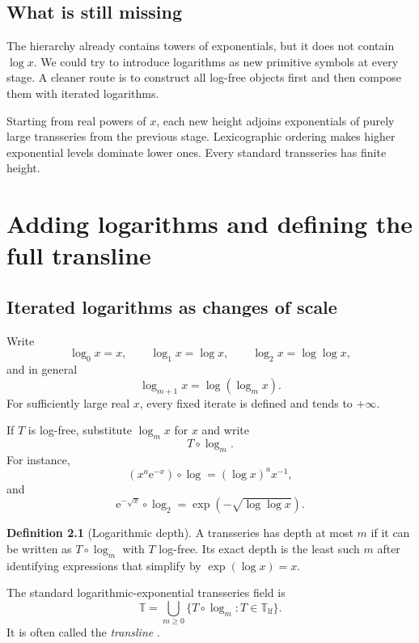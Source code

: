 \documentclass[11pt,oneside]{book}
\theoremstyle{definition}
\newtheorem{definition}[theorem]{Definition}
\theoremstyle{remark}
\newcommand{\T}{\mathbb{T}}
\newcommand{\e}{\mathrm{e}}
\newcommand{\compose}{\mathbin{\circ}}
\begin{document}
\section{What is still missing}

The hierarchy already contains towers of exponentials, but it does not contain
$\log x$. We could try to introduce logarithms as new primitive symbols at every
stage. A cleaner route is to construct all log-free objects first and then
compose them with iterated logarithms.

\begin{summarybox}
Starting from real powers of $x$, each new height adjoins exponentials of purely
large transseries from the previous stage. Lexicographic ordering makes higher
exponential levels dominate lower ones. Every standard transseries has finite
height.
\end{summarybox}

\chapter{Adding logarithms and defining the full transline}
\label{ch:logs}

\section{Iterated logarithms as changes of scale}

Write
\[
  \log_0 x=x,\qquad
  \log_1x=\log x,\qquad
  \log_2x=\log\log x,
\]
and in general
\[
  \log_{m+1}x=\log(\log_mx).
\]
For sufficiently large real $x$, every fixed iterate is defined and tends to
$+\infty$.

If $T$ is log-free, substitute $\log_mx$ for $x$ and write
\[
  T\compose\log_m.
\]
For instance,
\[
  (x^a\e^{-x})\compose\log
  =(\log x)^a x^{-1},
\]
and
\[
  \e^{-\sqrt{x}}\compose\log_2
  =\exp\!\left(-\sqrt{\log\log x}\right).
\]

\begin{definition}[Logarithmic depth]
A transseries has depth at most $m$ if it can be written as
$T\compose\log_m$ with $T$ log-free. Its exact depth is the least such $m$ after
identifying expressions that simplify by $\exp(\log x)=x$.
\end{definition}

The standard logarithmic-exponential transseries field is
\begin{equation}
  \T=\bigcup_{m\ge0}
       \{T\compose\log_m:T\in\T_{\mathrm{lf}}\}.
  \label{eq:full-transseries-field}
\end{equation}
It is often called the \emph{transline} \cite{vanDerHoevenBook,EdgarBeginners}.
\end{document}
